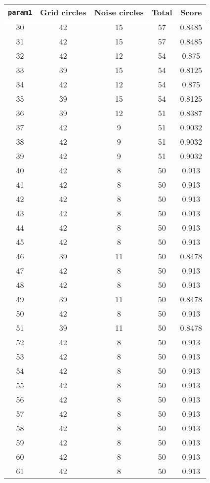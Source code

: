\documentclass[letterpaper, 12pt]{article}
\begin{document}
\begin{longtable}{|c|c|c|c|c|}
\hline
\textbf{\texttt{param1}} & \textbf{Grid circles} & \textbf{Noise circles} & \textbf{Total} & \textbf{Score} \\
\hline
30 & 42 & 15 & 57 & 0.8485 \\
\hline
31 & 42 & 15 & 57 & 0.8485 \\
\hline
32 & 42 & 12 & 54 & 0.875 \\
\hline
33 & 39 & 15 & 54 & 0.8125 \\
\hline
34 & 42 & 12 & 54 & 0.875 \\
\hline
35 & 39 & 15 & 54 & 0.8125 \\
\hline
36 & 39 & 12 & 51 & 0.8387 \\
\hline
37 & 42 & 9 & 51 & 0.9032 \\
\hline
38 & 42 & 9 & 51 & 0.9032 \\
\hline
39 & 42 & 9 & 51 & 0.9032 \\
\hline
40 & 42 & 8 & 50 & 0.913 \\
\hline
41 & 42 & 8 & 50 & 0.913 \\
\hline
42 & 42 & 8 & 50 & 0.913 \\
\hline
43 & 42 & 8 & 50 & 0.913 \\
\hline
44 & 42 & 8 & 50 & 0.913 \\
\hline
45 & 42 & 8 & 50 & 0.913 \\
\hline
46 & 39 & 11 & 50 & 0.8478 \\
\hline
47 & 42 & 8 & 50 & 0.913 \\
\hline
48 & 42 & 8 & 50 & 0.913 \\
\hline
49 & 39 & 11 & 50 & 0.8478 \\
\hline
50 & 42 & 8 & 50 & 0.913 \\
\hline
51 & 39 & 11 & 50 & 0.8478 \\
\hline
52 & 42 & 8 & 50 & 0.913 \\
\hline
53 & 42 & 8 & 50 & 0.913 \\
\hline
54 & 42 & 8 & 50 & 0.913 \\
\hline
55 & 42 & 8 & 50 & 0.913 \\
\hline
56 & 42 & 8 & 50 & 0.913 \\
\hline
57 & 42 & 8 & 50 & 0.913 \\
\hline
58 & 42 & 8 & 50 & 0.913 \\
\hline
59 & 42 & 8 & 50 & 0.913 \\
\hline
60 & 42 & 8 & 50 & 0.913 \\
\hline
61 & 42 & 8 & 50 & 0.913 \\

\end{longtable}
\end{document}
